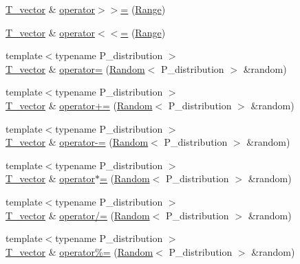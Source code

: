 \begin{DoxyCompactItemize}
\item 
\hyperlink{classVector_a29e279edfeac4d65aad0d814c05cfaf0}{T\+\_\+vector} \& \hyperlink{classVector_a08fa878a9d1fb1f980b14d2969902e65}{operator$>$$>$=} (\hyperlink{classRange}{Range})
\item 
\hyperlink{classVector_a29e279edfeac4d65aad0d814c05cfaf0}{T\+\_\+vector} \& \hyperlink{classVector_a30cdf31585a84377b693f3c5670c4a79}{operator$<$$<$=} (\hyperlink{classRange}{Range})
\item 
{\footnotesize template$<$typename P\+\_\+distribution $>$ }\\\hyperlink{classVector_a29e279edfeac4d65aad0d814c05cfaf0}{T\+\_\+vector} \& \hyperlink{classVector_aeda959b0cdc0f74139d0324fd4c4f024}{operator=} (\hyperlink{classRandom}{Random}$<$ P\+\_\+distribution $>$ \&random)
\item 
{\footnotesize template$<$typename P\+\_\+distribution $>$ }\\\hyperlink{classVector_a29e279edfeac4d65aad0d814c05cfaf0}{T\+\_\+vector} \& \hyperlink{classVector_aa863f6f9cd9b9f2c59a8d72beeeae009}{operator+=} (\hyperlink{classRandom}{Random}$<$ P\+\_\+distribution $>$ \&random)
\item 
{\footnotesize template$<$typename P\+\_\+distribution $>$ }\\\hyperlink{classVector_a29e279edfeac4d65aad0d814c05cfaf0}{T\+\_\+vector} \& \hyperlink{classVector_a7f38eb77093276be29a2391dc69f715d}{operator-\/=} (\hyperlink{classRandom}{Random}$<$ P\+\_\+distribution $>$ \&random)
\item 
{\footnotesize template$<$typename P\+\_\+distribution $>$ }\\\hyperlink{classVector_a29e279edfeac4d65aad0d814c05cfaf0}{T\+\_\+vector} \& \hyperlink{classVector_a9433fa4fb0036442677129e33404667f}{operator$\ast$=} (\hyperlink{classRandom}{Random}$<$ P\+\_\+distribution $>$ \&random)
\item 
{\footnotesize template$<$typename P\+\_\+distribution $>$ }\\\hyperlink{classVector_a29e279edfeac4d65aad0d814c05cfaf0}{T\+\_\+vector} \& \hyperlink{classVector_a5e65c32777f81ac13799361a34945d11}{operator/=} (\hyperlink{classRandom}{Random}$<$ P\+\_\+distribution $>$ \&random)
\item 
{\footnotesize template$<$typename P\+\_\+distribution $>$ }\\\hyperlink{classVector_a29e279edfeac4d65aad0d814c05cfaf0}{T\+\_\+vector} \& \hyperlink{classVector_ab93568a206aa01ef7740f94edbe90d86}{operator\%=} (\hyperlink{classRandom}{Random}$<$ P\+\_\+distribution $>$ \&random)

\end{DoxyCompactItemize}
